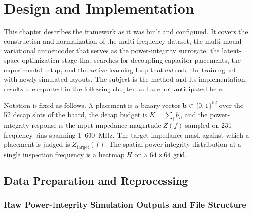 
\chapter{Design and Implementation}
\label{ch:design_implementation}

This chapter describes the framework as it was built and configured. It covers the construction and
normalization of the multi-frequency dataset, the multi-modal variational autoencoder that serves as
the power-integrity surrogate, the latent-space optimization stage that searches for decoupling
capacitor placements, the experimental setup, and the active-learning loop that extends the training
set with newly simulated layouts. The subject is the method and its implementation; results are
reported in the following chapter and are not anticipated here.

Notation is fixed as follows. A placement is a binary vector $\mathbf{b} \in \{0,1\}^{52}$ over the
52 decap slots of the board, the decap budget is $K = \sum_i b_i$, and the power-integrity response
is the input impedance magnitude $Z(f)$ sampled on 231 frequency bins spanning 1--600~MHz. The
target impedance mask against which a placement is judged is $Z_{\mathrm{target}}(f)$. The spatial
power-integrity distribution at a single inspection frequency is a heatmap $H$ on a
$64 \times 64$ grid. 

\section{Data Preparation and Reprocessing}
\label{sec:data_prep_reprocessing}

\subsection{Raw Power-Integrity Simulation Outputs and File Structure}
\label{subsec:raw_pi_outputs}

